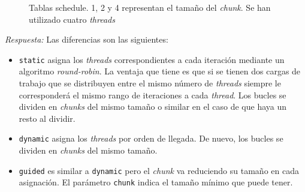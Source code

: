 \documentclass[11pt]{article}
\theoremstyle{definition-style}
\begin{document}
\begin{figure}[H]
    \caption{Tablas schedule. 1, 2 y 4 representan el tamaño del \emph{chunk}. Se han utilizado cuatro \textit{threads}}
    \begin{minipage}[t]{.33\linewidth}
        \centering
    \end{minipage}
    \begin{minipage}[t]{.33\linewidth}
        \centering
    \end{minipage}
    \begin{minipage}[t]{.33\linewidth}
        \centering

    \end{minipage}
\end{figure}

\emph{Respuesta:} Las diferencias son las siguientes: \begin{itemize}
    \item \texttt{static} asigna los \textit{threads} correspondientes a cada iteración mediante un algoritmo \textit{round-robin}. La ventaja que tiene es que si se tienen dos cargas de trabajo que se distribuyen entre el mismo número de \textit{threads} siempre le corresponderá el mismo rango de iteraciones a cada \textit{thread}. Los bucles se dividen en \textit{chunks} del mismo tamaño o similar en el caso de que haya un resto al dividir.
    \item \texttt{dynamic} asigna los \textit{threads} por orden de llegada. De nuevo, los bucles se dividen en \textit{chunks} del mismo tamaño.
    \item \texttt{guided} es similar a \texttt{dynamic} pero el \textit{chunk} va reduciendo su tamaño en cada asignación. El parámetro \texttt{chunk} indica el tamaño mínimo que puede tener.
\end{itemize}
\end{document}
